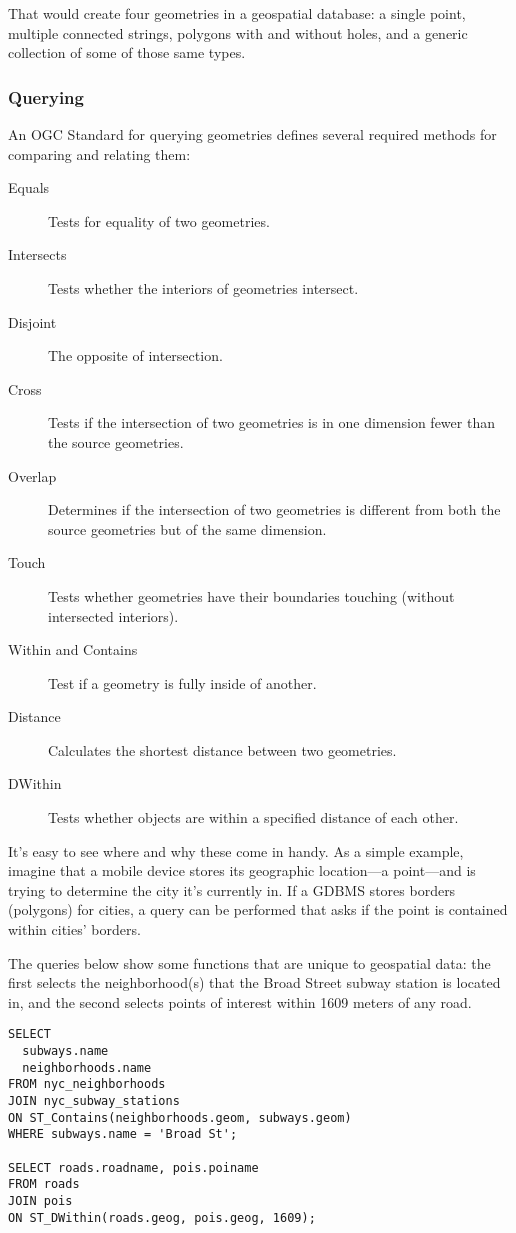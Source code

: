 That would create four geometries in a geospatial database: a single point, multiple connected strings, polygons with and without holes, and a generic collection of some of those same types.

\subsubsection{Querying}
An OGC Standard for querying geometries defines several required methods for comparing and relating them:

\begin{description}
  \item[Equals] Tests for equality of two geometries.
  \item[Intersects] Tests whether the interiors of geometries intersect.
  \item[Disjoint] The opposite of intersection.
  \item[Cross] Tests if the intersection of two geometries is in one dimension fewer than the source geometries.
  \item[Overlap] Determines if the intersection of two geometries is different from both the source geometries but of the same dimension.
  \item[Touch] Tests whether geometries have their boundaries touching (without intersected interiors).
  \item[Within and Contains] Test if a geometry is fully inside of another.
  \item[Distance] Calculates the shortest distance between two geometries.
  \item[DWithin] Tests whether objects are within a specified distance of each other.
\end{description}

It's easy to see where and why these come in handy. As a simple example, imagine that a mobile device stores its geographic location---a point---and is trying to determine the city it's currently in. If a GDBMS stores borders (polygons) for cities, a query can be performed that asks if the point is contained within cities' borders.

The queries below show some functions that are unique to geospatial data: the first selects the neighborhood(s) that the Broad Street subway station is located in, and the second selects points of interest within 1609 meters of any road.

\begin{verbatim}
SELECT
  subways.name
  neighborhoods.name
FROM nyc_neighborhoods
JOIN nyc_subway_stations
ON ST_Contains(neighborhoods.geom, subways.geom)
WHERE subways.name = 'Broad St';

SELECT roads.roadname, pois.poiname
FROM roads
JOIN pois 
ON ST_DWithin(roads.geog, pois.geog, 1609);
\end{verbatim}

